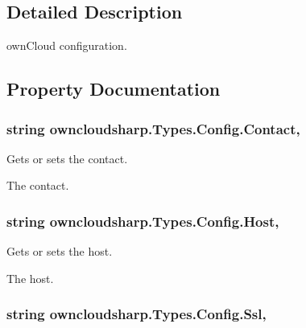 \subsection{Detailed Description}
own\+Cloud configuration. 



\subsection{Property Documentation}
\hypertarget{classowncloudsharp_1_1_types_1_1_config_ab4a9bf7102dfe2e637eb895f8d0a03e1}{}
\subsubsection[{Contact}]{\setlength{\rightskip}{0pt plus 5cm}string owncloudsharp.\+Types.\+Config.\+Contact\hspace{0.3cm}{\ttfamily [get]}, {\ttfamily [set]}}\label{classowncloudsharp_1_1_types_1_1_config_ab4a9bf7102dfe2e637eb895f8d0a03e1}


Gets or sets the contact. 

The contact.\hypertarget{classowncloudsharp_1_1_types_1_1_config_a36887dfa541a00bd4b8f7def693150b5}{}
\subsubsection[{Host}]{\setlength{\rightskip}{0pt plus 5cm}string owncloudsharp.\+Types.\+Config.\+Host\hspace{0.3cm}{\ttfamily [get]}, {\ttfamily [set]}}\label{classowncloudsharp_1_1_types_1_1_config_a36887dfa541a00bd4b8f7def693150b5}


Gets or sets the host. 

The host.\hypertarget{classowncloudsharp_1_1_types_1_1_config_abf92cd17e728b4c5d028fe27bf36d255}{}
\subsubsection[{Ssl}]{\setlength{\rightskip}{0pt plus 5cm}string owncloudsharp.\+Types.\+Config.\+Ssl\hspace{0.3cm}{\ttfamily [get]}, {\ttfamily [set]}}\label{classowncloudsharp_1_1_types_1_1_config_abf92cd17e728b4c5d028fe27bf36d255}



